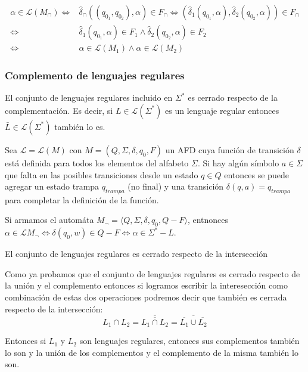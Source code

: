 \begin{demo}[0.8\textwidth]
  \begin{align*}
    \alpha\in\mathcal{L}(M_\cap) \iff & \hat\delta_\cap((q_{0_1}, q_{0_2}), \alpha) \in F_\cap \iff (\hat\delta_1(q_{0_1}, \alpha), \hat\delta_2(q_{0_2}, \alpha)) \in F_\cap \\ \iff &\hat\delta_1(q_{0_1}, \alpha) \in F_1 \land \hat\delta_2(q_{0_2}, \alpha) \in F_2 \\ \iff & \alpha\in\mathcal{L}(M_1) \land \alpha\in\mathcal{L}(M_2)
  \end{align*}
\end{demo}

\subsubsection{Complemento de lenguajes regulares}
\begin{teorema}
  El conjunto de lenguajes regulares incluido en \(\Sigma^*\) es cerrado respecto de la complementación. Es decir, si \(L\in\mathcal{L}(\Sigma^*)\) es un lenguaje regular entonces \(\bar{L}\in\mathcal{L}(\Sigma^*)\) también lo es.
\end{teorema}
\begin{demo}[0.8\textwidth]
  Sea \(\mathcal{L} = \mathcal{L}(M)\) con \(M=(Q,\Sigma,\delta,q_0,F)\) un AFD cuya función de transición \(\delta\) está definida para todos los elementos del alfabeto \(\Sigma\). Si hay algún símbolo \(a\in\Sigma\) que falta en las posibles transiciones desde un estado \(q\in Q\) entonces se puede agregar un estado trampa \(q_{trampa}\) (no final) y una transición \(\delta(q,a) = q_{trampa}\) para completar la definición de la función.

  Si armamos el automáta \(M_{\lnot} =\langle Q,\Sigma,\delta,q_0,Q - F\rangle\), entnonces \(\alpha\in\mathcal{L}M_{\lnot} \iff \delta(q_0, w) \in Q - F \iff \alpha\in\Sigma^* - L\).
\end{demo}

\begin{teorema}
  El conjunto de lenguajes regulares es cerrado respecto de la intersección
\end{teorema}

\begin{demo}[0.8\textwidth]
  Como ya probamos que el conjunto de lenguajes regulares es cerrado respecto de la unión y el complemento entonces si logramos escribir la interesección como combinación de estas dos operaciones podremos decir que también es cerrada respecto de la intersección:
  \[
    L_1 \cap L_2 = \overline{\overline{L_1\cap L_2}} = \overline{\overline{L_1} \cup \overline{L_2}}
  \]
\end{demo}
\begin{demoPart}[0.8\textwidth]
  Entonces si \(L_1\) y \(L_2\) son lenguajes regulares, entonces sus complementos también lo son y la unión de los complementos y el complemento de la misma también lo son.
\end{demoPart}

